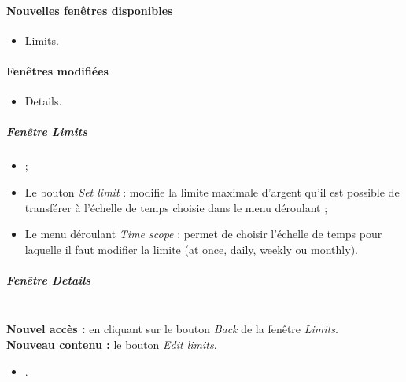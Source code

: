 \paragraph{Nouvelles fenêtres disponibles}
\begin{itemize}
\item Limits.
\end{itemize}

\paragraph{Fenêtres modifiées}
\begin{itemize}
\item Details. %
\end{itemize}


\subparagraph{Fenêtre \emph{Limits}}
\begin{itemize}
\item {} ;
\item Le bouton \emph{Set limit} : modifie la limite maximale d'argent qu'il est possible de transférer à l'échelle de temps choisie dans le menu déroulant ;
\item Le menu déroulant \emph{Time scope} : permet de choisir l'échelle de temps pour laquelle il faut modifier la limite (at once, daily, weekly ou monthly).
\end{itemize}


\subparagraph{Fenêtre \emph{Details}}
\ \\ \noindent\textbf{Nouvel accès :}  en cliquant sur le bouton \emph{Back} de la fenêtre \emph{Limits}.
\ \\ \textbf{Nouveau contenu :}  le bouton \emph{Edit limits}.
\begin{itemize}
\item {}.
\end{itemize}

